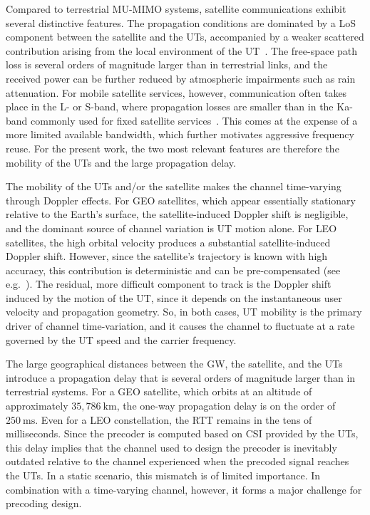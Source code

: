 Compared to terrestrial \ac{MU}-\ac{MIMO} systems, satellite communications exhibit several distinctive features. 
The propagation conditions are dominated by a \acf{LoS} component between the satellite and the \acp{UT}, accompanied by a weaker scattered contribution arising from the local environment of the \ac{UT}~\cite{4_mimo_over_satellite_review}.
The free-space path loss is several orders of magnitude larger than in terrestrial links, and the received power can be further reduced by atmospheric impairments such as rain attenuation.
For mobile satellite services, however, communication often takes place in the L- or S-band, where propagation losses are smaller than in the Ka-band commonly used for fixed satellite services~\cite{1_signal_processing_for_satellites}.
This comes at the expense of a more limited available bandwidth, which further motivates aggressive frequency reuse.
For the present work, the two most relevant features are therefore the mobility of the \acp{UT} and the large propagation delay.

The mobility of the \acp{UT} and/or the satellite makes the channel time-varying through Doppler effects.
For \ac{GEO} satellites, which appear essentially stationary relative to the Earth's surface, the satellite-induced Doppler shift is negligible, and the dominant source of channel variation is \ac{UT} motion alone.
For \ac{LEO} satellites, the high orbital velocity produces a substantial satellite-induced Doppler shift. 
However, since the satellite's trajectory is known with high accuracy, this contribution is deterministic and can be pre-compensated (see e.g.~\cite{doppler_compensation_mimo_leo}).
The residual, more difficult component to track is the Doppler shift induced by the motion of the \ac{UT}, since it depends on the instantaneous user velocity and propagation geometry.
So, in both cases, \ac{UT} mobility is the primary driver of channel time-variation, and it causes the channel to fluctuate at a rate governed by the \ac{UT} speed and the carrier frequency.

The large geographical distances between the \ac{GW}, the satellite, and the \acp{UT} introduce a propagation delay that is several orders of magnitude larger than in terrestrial systems. 
For a \ac{GEO} satellite, which orbits at an altitude of approximately $35{,}786~\mathrm{km}$, the one-way propagation delay is on the order of $250~\mathrm{ms}$.
Even for a \ac{LEO} constellation, the \ac{RTT} remains in the tens of milliseconds.
Since the precoder is computed based on \ac{CSI} provided by the \acp{UT}, this delay implies that the channel used to design the precoder is inevitably outdated relative to the channel experienced when the precoded signal reaches the \acp{UT}.
In a static scenario, this mismatch is of limited importance.
In combination with a time-varying channel, however, it forms a major challenge for precoding design.

